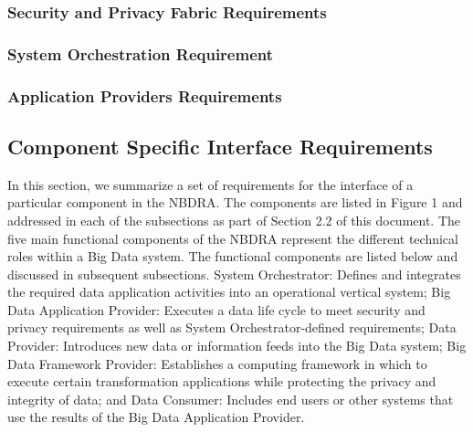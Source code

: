 \documentclass[10pt]{article}
\begin{document}
\subsubsection{Security and Privacy Fabric Requirements}


\subsubsection{System Orchestration Requirement}


\subsubsection{Application Providers Requirements}


\subsection{Component Specific Interface Requirements}

In this section, we summarize a set of requirements for the interface of a particular component in the NBDRA. The components are listed in Figure 1 and addressed in each of the subsections as part of Section 2.2 of this document. The five main functional components of the NBDRA represent the different technical roles within a Big Data system. The functional components are listed below and discussed in subsequent subsections.
System Orchestrator: Defines and integrates the required data application activities into an operational vertical system;
Big Data Application Provider: Executes a data life cycle to meet security and privacy requirements as well as System Orchestrator-defined requirements;
Data Provider: Introduces new data or information feeds into the Big Data system;
Big Data Framework Provider: Establishes a computing framework in which to execute certain transformation applications while protecting the privacy and integrity of data; and
Data Consumer: Includes end users or other systems that use the results of the Big Data Application Provider.
\end{document}
